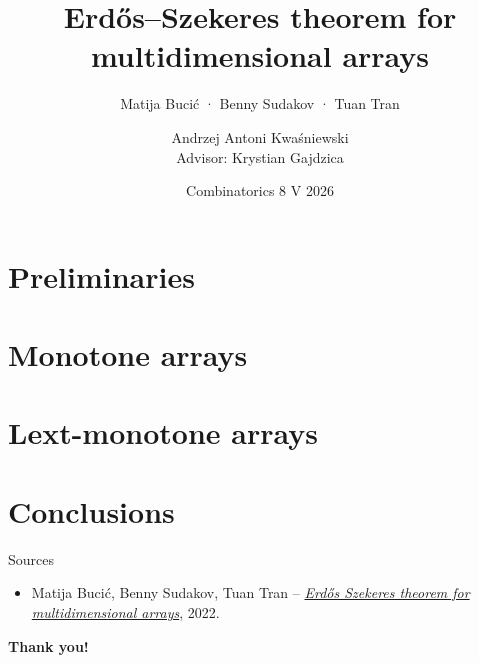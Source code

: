\documentclass[aspectratio=169]{beamer}
\title[Title]{Erdős--Szekeres theorem for multidimensional arrays}
\subtitle{ Matija Bucić · Benny Sudakov · Tuan Tran}
\author{Andrzej Antoni Kwaśniewski \\ 
Advisor: Krystian Gajdzica}
\date[]{Combinatorics 8 V 2026}
\begin{document}
\onehalfspacing
\mysimplefootline

\frame{\titlepage}

\section{Preliminaries}

\section{Monotone arrays}

\section{Lext-monotone arrays}

\section{Conclusions}

\begin{frame}{Sources}
\label{references}
    \begin{itemize}
        \item Matija Bucić, Benny Sudakov,  Tuan Tran --  \href{https://arxiv.org/pdf/2301.02020}{\textit{Erdős Szekeres theorem for multidimensional arrays}}, 2022. \\
    \end{itemize}
  \centering
  \Large \textbf{Thank you!}
\end{frame}

\end{document}
